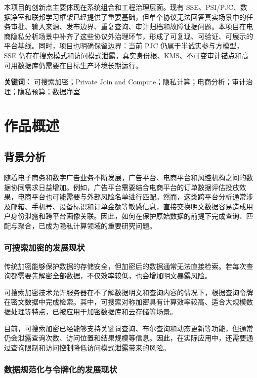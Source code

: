 \documentclass[UTF8,a4paper,12pt,oneside]{ctexrep}
\begin{document}
本项目的创新点主要体现在系统组合和工程治理层面。现有 SSE、PSI/PJC、数据净室和联邦学习框架已经提供了重要基础，但单个协议无法回答真实场景中的任务审批、输入来源、发布边界、重复查询、审计归档和故障证据问题。本项目在电商隐私分析场景中补齐了这些协议外治理环节，形成了可复现、可验证、可展示的平台基线。同时，项目也明确保留边界：当前 PJC 仍属于半诚实参与方模型，SSE 仍存在搜索模式和访问模式泄露，真实身份根、KMS、不可变审计锚点和高可用数据库仍需要在目标生产环境长期运行。

\vspace{1em}
\noindent\textbf{关键词：} 可搜索加密；Private Join and Compute；隐私计算；电商分析；审计治理；隐私预算；数据净室

\tableofcontents
\clearpage
{}

\chapter{作品概述}

\section{背景分析}

随着电子商务和数字广告业务不断发展，广告平台、电商平台和风控机构之间的数据协同需求日益增加。例如，广告平台需要结合电商平台的订单数据评估投放效果，电商平台也可能需要与外部风险名单进行匹配。然而，这类跨平台分析通常涉及邮箱、手机号、设备标识和订单金额等敏感信息，直接交换明文数据容易造成用户身份泄露和跨平台画像关联。因此，如何在保护原始数据的前提下完成查询、匹配与聚合，已成为隐私计算领域的重要研究问题。

\subsection{可搜索加密的发展现状}

传统加密能够保护数据的存储安全，但加密后的数据通常无法直接检索。若每次查询都需要先解密全部数据，不仅效率较低，也会增加明文暴露风险。

可搜索加密技术允许服务器在不了解数据明文和查询内容的情况下，根据查询令牌在密文数据中完成检索。其中，可搜索对称加密具有计算效率较高、适合大规模数据处理等特点，已被应用于加密数据库和云存储等场景。

目前，可搜索加密已经能够支持关键词查询、布尔查询和动态更新等功能，但通常仍会泄露查询次数、访问位置和结果规模等信息。因此，在实际应用中，还需要通过查询限制和访问控制降低访问模式泄露带来的风险。

\subsection{数据规范化与令牌化的发展现状}
\end{document}

